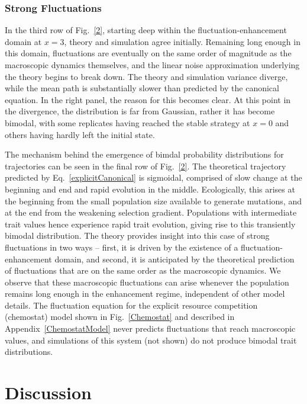 \subsubsection{Strong Fluctuations}
In the third row of Fig.~\ref{2}, starting deep within the fluctuation-enhancement domain at $x = 3$, theory and simulation agree initially.  Remaining long enough in this domain, fluctuations are eventually on the same order of magnitude as the macroscopic dynamics themselves, and the linear noise approximation underlying the theory begins to break down.  The theory and simulation variance diverge, while the mean path is substantially slower than predicted by the canonical equation.   In the right panel, the reason for this becomes clear.  At this point in the divergence, the distribution is far from Gaussian, rather it has become bimodal, with some replicates having reached the stable strategy at $x=0$ and others having hardly left the initial state.  
 
The mechanism behind the emergence of bimdal probability distributions for trajectories can be seen in the final row of Fig.~\ref{2}.  The theoretical trajectory predicted by Eq.~\eqref{explicitCanonical} is sigmoidal, comprised of slow change at the beginning and end and rapid evolution in the middle.  Ecologically, this arises at the beginning from the small population size available to generate mutations, and at the end from the weakening selection gradient.  Populations with intermediate trait values hence experience rapid trait evolution, giving rise to this transiently bimodal distribution.  The theory provides insight into this case of strong fluctuations in two ways -- first, it is driven by the existence of a fluctuation-enhancement domain, and second, it is anticipated by the theoretical prediction of fluctuations that are on the same order as the macroscopic dynamics.  We observe that these macroscopic fluctuations can arise whenever the population remains long enough in the enhancement regime, independent of other model details.  The fluctuation equation for the explicit resource competition (chemostat) model shown in Fig.~\ref{Chemostat} and described in Appendix~\ref{ChemostatModel} never predicts fluctuations that reach macroscopic values, and simulations of this system (not shown) do not produce bimodal trait distributions.  
 
\section{Discussion}
 
